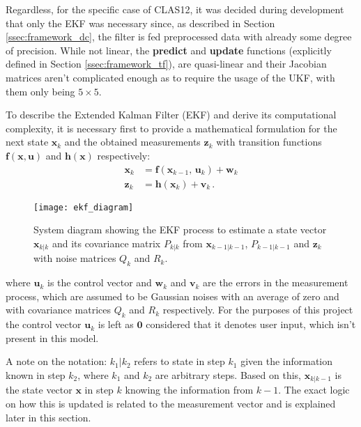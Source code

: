 Regardless, for the specific case of CLAS12, it was decided during development that only the EKF was necessary since, as described in Section \ref{ssec:framework_dc}, the filter is fed preprocessed data with already some degree of precision.
While not linear, the \textbf{predict} and \textbf{update} functions (explicitly defined in Section \ref{ssec:framework_tf}), are quasi-linear and their Jacobian matrices aren't complicated enough as to require the usage of the UKF, with them only being $5\times5$.

\newpage

To describe the Extended Kalman Filter (EKF) and derive its computational complexity, it is necessary first to provide a mathematical formulation for the next state $\mathbf{x}_k$ and the obtained measurements $\mathbf{z}_k$ with transition functions $\mathbf{f}(\mathbf{x}, \mathbf{u})$ and $\mathbf{h}(\mathbf{x})$ respectively:
    \begin{align*}
        \mathbf{x}_k &= \mathbf{f}(\mathbf{x}_{k-1}, \,\mathbf{u}_k) + \mathbf{w}_k\\
        \mathbf{z}_k &= \mathbf{h}(\mathbf{x}_k) + \mathbf{v}_k\,.
    \end{align*}
    

    \begin{figure}[ht]
        \centering
        \texttt{[image: ekf\_diagram]}
        \caption{\label{fig:ekf_diagram} System diagram showing the EKF process to estimate a state vector $\mathbf{x}_{k|k}$ and its covariance matrix $P_{k|k}$ from $\mathbf{x}_{k-1|k-1}$, $P_{k-1|k-1}$ and $\mathbf{z}_k$ with noise matrices $Q_k$ and $R_k$.}
    \end{figure}
    
where $\mathbf{u}_k$ is the control vector and $\mathbf{w}_k$ and $\mathbf{v}_k$ are the errors in the measurement process, which are assumed to be Gaussian noises with an average of zero and with covariance matrices $Q_k$ and $R_k$ respectively.
For the purposes of this project the control vector $\mathbf{u}_k$ is left as $\mathbf{0}$ considered that it denotes user input, which isn't present in this model.

A note on the notation: $k_1|k_2$ refers to state in step $k_1$ given the information known in step $k_2$, where $k_1$ and $k_2$ are arbitrary steps.
Based on this, $\mathbf{x}_{k|k-1}$ is the state vector $\mathbf{x}$ in step $k$ knowing the information from $k-1$.
The exact logic on how this is updated is related to the measurement vector and is explained later in this section.

